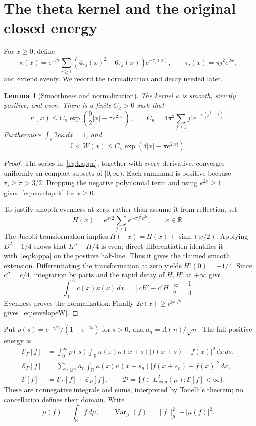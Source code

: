 \documentclass[11pt,a4paper]{article}
\numberwithin{equation}{section}
\newtheorem{lemma}[theorem]{Lemma}
\theoremstyle{definition}
\theoremstyle{remark}
\newcommand{\R}{\mathbb R}
\newcommand{\E}{\mathcal E}
\newcommand{\D}{\mathcal D}
\newcommand{\He}{L^2_{\mathrm{even}}(\mu)}
\newcommand{\Var}{\operatorname{Var}}
\newcommand{\norm}[1]{\lVert #1\rVert}
\begin{document}
\section{The theta kernel and the original closed energy}\label{sec:energy}

For $x\ge0$, define
\begin{equation}\label{eq:kappa}
 \kappa(x)=e^{x/2}\sum_{j\ge1}(4\tau_j(x)^2-6\tau_j(x))e^{-\tau_j(x)},
 \qquad \tau_j(x)=\pi j^2e^{2x},
\end{equation}
and extend evenly. We record the normalization and decay needed later.

\begin{lemma}[Smoothness and normalization]\label{lem:theta}
The kernel $\kappa$ is smooth, strictly positive, and even. There is a finite $C_\kappa>0$ such that
\begin{equation}\label{eq:envelopek}
 \kappa(x)\le C_\kappa\exp\!\left(\frac92|x|-\pi e^{2|x|}\right),
 \qquad
 C_\kappa=4\pi^2\sum_{j\ge1}j^4e^{-\pi(j^2-1)}.
\end{equation}
Furthermore $\int_\R2c\kappa\,dx=1$, and
\begin{equation}\label{eq:envelopeW}
 0<W(x)\le C_\kappa\exp(4|x|-\pi e^{2|x|}).
\end{equation}
\end{lemma}
\begin{proof}
The series in~\eqref{eq:kappa}, together with every derivative, converges uniformly on compact subsets of $[0,\infty)$. Each summand is positive because $\tau_j\ge\pi>3/2$. Dropping the negative polynomial term and using $e^{2x}\ge1$ gives~\eqref{eq:envelopek} for $x\ge0$.

To justify smooth evenness at zero, rather than assume it from reflection, set
\[
 H(x)=e^{x/2}\sum_{j\ge1}e^{-\pi j^2e^{2x}},\qquad x\in\R.
\]
The Jacobi transformation \cite[Eq.~20.7.32]{DLMF} implies
$H(-x)=H(x)+\sinh(x/2)$. Applying $D^2-1/4$ shows that $H''-H/4$ is even; direct differentiation identifies it with~\eqref{eq:kappa} on the positive half-line. Thus it gives the claimed smooth extension. Differentiating the transformation at zero yields $H'(0)=-1/4$. Since $c''=c/4$, integration by parts and the rapid decay of $H,H'$ at $+\infty$ give
\[
 \int_0^\infty c(x)\kappa(x)\,dx
  =[cH'-c'H]_0^\infty=\frac14.
\]
Evenness proves the normalization. Finally $2c(x)\ge e^{|x|/2}$ gives~\eqref{eq:envelopeW}.
\end{proof}

Put $\rho(s)=e^{-s/2}/(1-e^{-2s})$ for $s>0$, and $a_n=\Lambda(n)/\sqrt n$. The full positive energy is
\begin{align}
 \E_\Gamma[f]&=\int_0^\infty\rho(s)\int_\R
       \kappa(x)\kappa(x+s)|f(x+s)-f(x)|^2\,dx\,ds,\label{eq:Eg}\\
 \E_P[f]&=\sum_{n\ge2}a_n\int_\R
       \kappa(x)\kappa(x+s_n)|f(x+s_n)-f(x)|^2\,dx,\label{eq:Ep}\\
 \E[f]&=\E_\Gamma[f]+\E_P[f],\qquad
 \D=\{f\in\He:\E[f]<\infty\}.\label{eq:Edomain}
\end{align}
These are nonnegative integrals and sums, interpreted by Tonelli's theorem; no cancellation defines their domain. Write
\[
 \mu(f)=\int_\R f\,d\mu,\qquad
 \Var_\mu(f)=\norm{f}_\mu^2-|\mu(f)|^2.
\]
\end{document}
